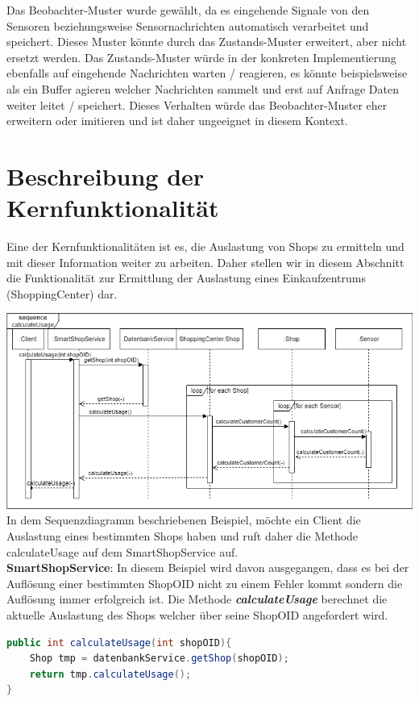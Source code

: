 \documentclass[runningheads]{llncs}
\begin{document}
Das Beobachter-Muster wurde gewählt, da es eingehende Signale von den Sensoren beziehungsweise Sensornachrichten automatisch verarbeitet und speichert.
Dieses Muster könnte durch das Zustands-Muster erweitert, aber nicht ersetzt werden.
Das Zustands-Muster würde in der konkreten Implementierung ebenfalls auf eingehende Nachrichten warten / reagieren, es könnte beispielsweise als ein Buffer agieren welcher Nachrichten sammelt und erst auf Anfrage Daten weiter leitet / speichert.
Dieses Verhalten würde das Beobachter-Muster eher erweitern oder imitieren und ist daher ungeeignet in diesem Kontext.


\newpage
\section{Beschreibung der Kernfunktionalität}
Eine der Kernfunktionalitäten ist es, die Auslastung von Shops zu ermitteln und mit dieser Information weiter zu arbeiten.
Daher stellen wir in diesem Abschnitt die Funktionalität zur Ermittlung der Auslastung eines Einkaufzentrums (ShoppingCenter) dar.

\includegraphics[width=\linewidth]{images/Sequenzdiagramm}
In dem Sequenzdiagramm beschriebenen Beispiel, möchte ein Client die Auslastung eines bestimmten Shops haben und ruft daher die Methode calculateUsage auf dem SmartShopService auf.
\\

\textbf{SmartShopService}: In diesem Beispiel wird davon ausgegangen, dass es bei der Auflösung einer bestimmten ShopOID nicht zu einem Fehler kommt sondern die Auflösung immer erfolgreich ist.
Die Methode \textbf{\textit{calculateUsage}} berechnet die aktuelle Auslastung des Shops welcher über seine ShopOID angefordert wird.
\begin{lstlisting}[language=Java, basicstyle=\scriptsize]
public int calculateUsage(int shopOID){
	Shop tmp = datenbankService.getShop(shopOID);
	return tmp.calculateUsage();
}
\end{lstlisting}
\end{document}
